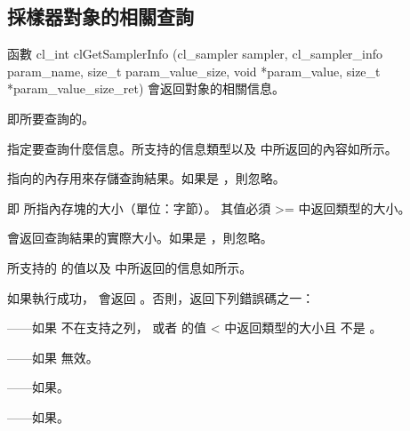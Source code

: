 \subsection{採樣器對象的相關查詢}

函數
\startclc
cl_int clGetSamplerInfo (cl_sampler sampler,
			cl_sampler_info param_name,
			size_t param_value_size,
			void *param_value,
			size_t *param_value_size_ret)
\stopclc
會返回對象的相關信息。

 即所要查詢的。

 指定要查詢什麼信息。所支持的信息類型以及  中所返回的內容如所示。

 指向的內存用來存儲查詢結果。如果是 ，則忽略。

 即  所指內存塊的大小（單位：字節）。
其值必須 >= 中返回類型的大小。

 會返回查詢結果的實際大小。如果是 ，則忽略。

 所支持的  的值以及  中所返回的信息如所示。

{}

如果執行成功， 會返回 。否則，返回下列錯誤碼之一：
\startigBase
\item {}——如果  不在支持之列，
  或者  的值 < 中返回類型的大小且  不是 。
\item {}——如果  無效。
\item {}——如果\scdevfailres。
\item {}——如果\schostfailres。
\stopigBase

